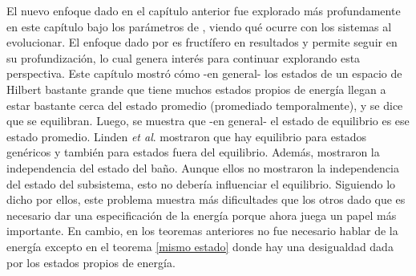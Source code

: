 El nuevo enfoque dado en el capítulo anterior fue explorado más profundamente en este capítulo bajo los parámetros de \cite{LindenPaper}, viendo qué ocurre con los sistemas al evolucionar. El enfoque dado por \cite{Popescu2006} es fructífero en resultados y permite seguir en su profundización, lo cual genera interés para continuar explorando esta perspectiva. Este capítulo mostró cómo -en general- los estados de un espacio de Hilbert bastante grande que tiene muchos estados propios de energía llegan a estar bastante cerca del estado promedio (promediado temporalmente), y se dice que se equilibran. Luego, se muestra que -en general- el estado de equilibrio es ese estado promedio. Linden \textit{et al}. mostraron que hay equilibrio para estados genéricos y también para estados fuera del equilibrio. Además, mostraron la independencia del estado del baño. Aunque ellos no mostraron la independencia del estado del subsistema, esto no debería influenciar el equilibrio. Siguiendo lo dicho por ellos, este problema muestra más dificultades que los otros dado que es necesario dar una especificación de la energía porque ahora juega un papel más importante. En cambio, en los teoremas anteriores no fue necesario hablar de la energía excepto en el teorema \ref{mismo estado} donde hay una desigualdad dada por los estados propios de energía. 

